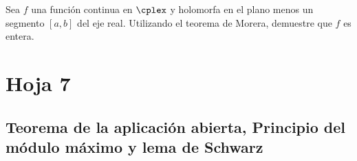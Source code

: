 \begin{problem}
Sea $f$ una función continua en $\cplex$ y holomorfa en el plano menos un segmento $ [ a, b ] $ del eje real. Utilizando el teorema de Morera, demuestre que $f$ es entera.
\solution

\end{problem}


\newpage
\section{Hoja 7}
\subsection{Teorema de la aplicación abierta, Principio del módulo máximo y lema de Schwarz}

